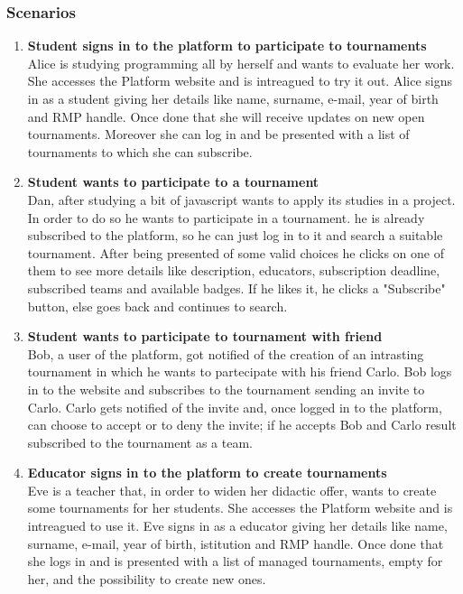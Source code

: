 \subsubsection{Scenarios}
\begin{enumerate}[label=$\bullet$ \textbf{SC\arabic*:}]
    \item \textbf{Student signs in to the platform to participate to tournaments}\\ Alice is studying programming all by herself and wants to evaluate her work. She accesses the Platform website and is intreagued to try it out. Alice signs in as a student giving her details like name, surname, e-mail,  year of birth and RMP handle. Once done that she will receive updates on new open tournaments. Moreover she can log in and be presented with a list of tournaments to which she can subscribe.
    \item \textbf{Student wants to participate to a tournament}\\ Dan, after studying a bit of javascript wants to apply its studies in a project. In order to do so he wants to participate in a tournament. he is already subscribed to the platform, so he can just log in to it and search a suitable tournament. After being presented of some valid choices he clicks on one of them to see more details like description, educators, subscription deadline, subscribed teams and available badges. If he likes it, he clicks a "Subscribe" button, else goes back and continues to search.
    \item \textbf{Student wants to participate to tournament with friend}\\ Bob, a user of the platform, got notified of the creation of an intrasting tournament in which he wants to partecipate with his friend Carlo. Bob logs in to the website and subscribes to the tournament sending an invite to Carlo. Carlo gets notified of the invite and, once logged in to the platform, can choose to accept or to deny the invite; if he accepts Bob and Carlo result subscribed to the tournament as a team.
    \item \textbf{Educator signs in to the platform to create tournaments}\\ Eve is a teacher that, in order to widen her didactic offer, wants to create some tournaments for her students. She accesses the Platform website and is intreagued to use it. Eve signs in as a educator giving her details like name, surname, e-mail, year of birth, istitution and RMP handle. Once done that she logs in and is presented with a list of managed tournaments, empty for her, and the possibility to create new ones.

\end{enumerate}
